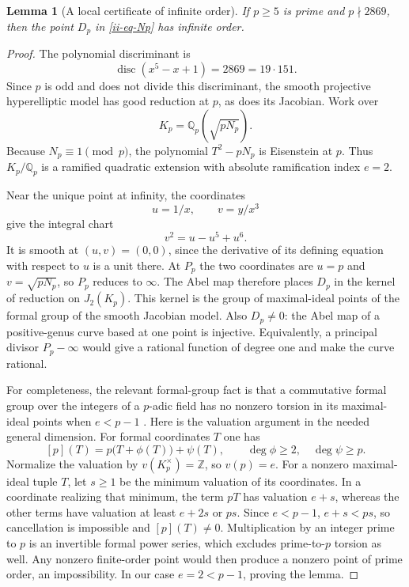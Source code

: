 \documentclass[11pt,a4paper]{article}
\newtheorem{lemma}[theorem]{Lemma}
\theoremstyle{definition}
\theoremstyle{remark}
\numberwithin{equation}{section}
\begin{document}
\begin{lemma}[A local certificate of infinite order]
\label{ii-lem-nontorsion}
If $p\ge5$ is prime and $p\nmid2869$, then the point $D_p$ in
\eqref{ii-eq-Np} has infinite order.
\end{lemma}
\begin{proof}
The polynomial discriminant is
\[
 \operatorname{disc}(x^5-x+1)=2869=19\cdot151.
\]
Since $p$ is odd and does not divide this discriminant, the smooth
projective hyperelliptic model has good reduction at $p$, as does its
Jacobian.  Work over
\[
 K_p=\mathbb Q_p(\sqrt{pN_p}).
\]
Because $N_p\equiv1\pmod p$, the polynomial $T^2-pN_p$ is Eisenstein
at $p$.  Thus $K_p/\mathbb Q_p$ is a ramified quadratic extension with
absolute ramification index $e=2$.

Near the unique point at infinity, the coordinates
\[
 u=1/x,\qquad v=y/x^3
\]
give the integral chart
\begin{equation}\label{ii-eq-infinity-chart}
 v^2=u-u^5+u^6.
\end{equation}
It is smooth at $(u,v)=(0,0)$, since the derivative of its defining
equation with respect to $u$ is a unit there.  At $P_p$ the two
coordinates are $u=p$ and $v=\sqrt{pN_p}$, so $P_p$ reduces to
$\infty$.  The Abel map therefore places $D_p$ in the kernel of
reduction on $J_2(K_p)$.  This kernel is the group of maximal-ideal
points of the formal group of the smooth Jacobian model.  Also $D_p\ne0$:
the Abel map of a positive-genus curve based at one point is injective.
Equivalently, a principal divisor $P_p-\infty$ would give a rational
function of degree one and make the curve rational.

For completeness, the relevant formal-group fact is that a commutative
formal group over the integers of a $p$-adic field has no nonzero
torsion in its maximal-ideal points when $e<p-1$
\cite[Proposition~9 and the following paragraph]{ii-ClarkXarles}.
Here is the valuation argument in the needed general dimension.
For formal coordinates $T$ one has
\[
 [p](T)=p\bigl(T+\phi(T)\bigr)+\psi(T),\qquad
 \deg\phi\ge2,\quad\deg\psi\ge p.
\]
Normalize the valuation by $v(K_p^{\times})=\mathbb Z$, so $v(p)=e$.
For a nonzero maximal-ideal tuple $T$, let $s\ge1$ be the minimum
valuation of its coordinates.  In a coordinate realizing that minimum,
the term $pT$ has valuation $e+s$, whereas the other terms have
valuation at least $e+2s$ or $ps$.  Since $e<p-1$,
$e+s<ps$, so cancellation is impossible and $[p](T)\ne0$.
Multiplication by an integer prime to $p$ is an invertible formal power
series, which excludes prime-to-$p$ torsion as well.  Any nonzero
finite-order point would then produce a nonzero point of prime order,
an impossibility.  In our case $e=2<p-1$, proving the lemma.
\end{proof}
\end{document}
